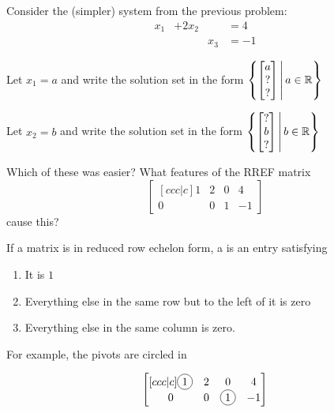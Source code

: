 \begin{applicationActivities}
\begin{activity}{10}
Consider the (simpler) system from the previous problem:
	\begin{alignat*}{3}
		x_1 &+ 2x_2 & &= 4\\
	     	 & &x_3 &= -1
	\end{alignat*}
\begin{subactivity}
Let $x_1=a$ and write the solution set in the form
\( \left\{ \begin{bmatrix} a \\ ? \\ ? \end{bmatrix} \,\middle|\, a \in \mathbb{R} \right\} \)
\end{subactivity}
\begin{subactivity}
Let $x_2=b$ and write the solution set in the form
\( \left\{ \begin{bmatrix} ? \\ b \\ ? \end{bmatrix} \,\middle|\, b \in \mathbb{R} \right\} \)
\end{subactivity}
\begin{subactivity}
Which of these was easier?  What features of the RREF matrix \[\begin{bmatrix}[ccc|c] 1 & 2 & 0 & 4 \\ 0 & 0 & 1 & -1 \end{bmatrix}\] cause this?
\end{subactivity}
\end{activity}

\begin{definition}
If a matrix is in reduced row echelon form, a  is an entry satisfying
\begin{enumerate}[1.]
\item It is $1$
\item Everything else in the same row but to the left of it is zero
\item Everything else in the same column is zero.
\end{enumerate}

For example, the pivots are circled in

\[\begin{bmatrix}[ccc|c] \circledNumber{1} & 2 & 0 & 4 \\ 0 & 0 & \circledNumber{1} & -1 \end{bmatrix}\]
\end{definition}



\end{applicationActivities}
